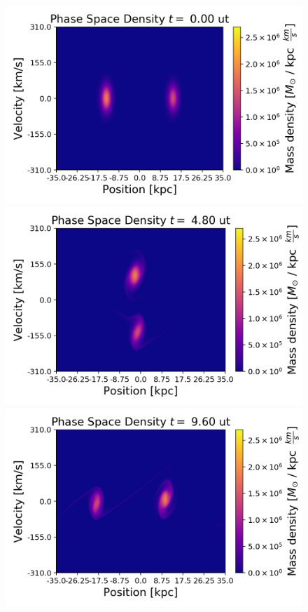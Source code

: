\begin{figure}[h!]
    \centering
    \includegraphics[scale=0.45]{imag/bullet0.png}
    \includegraphics[scale=0.45]{imag/bullet12.png}
    \includegraphics[scale=0.45]{imag/bullet24.png}

\end{figure}
